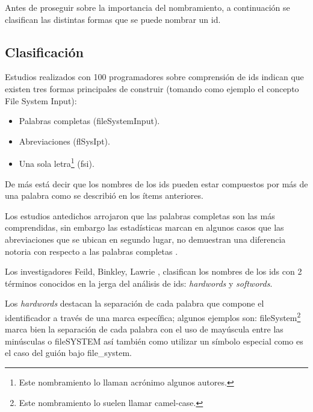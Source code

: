 \documentclass[a4paper,12pt]{report}
\begin{document}

Antes de proseguir sobre la importancia del nombramiento, a continuación se clasifican las distintas formas que se puede nombrar un id.

\subsection{Clasificación}
\label{sec:clasif}%

Estudios realizados con 100 programadores \cite{DCHD06} sobre comprensión de ids indican que existen tres formas principales de construir (tomando como ejemplo el concepto \textsf{File System Input}): 

\begin{itemize}
\itemsep0em%
\item Palabras completas (\textsf{fileSystemInput}).
\item Abreviaciones (\textsf{flSysIpt}).
\item Una sola letra\footnote[1]{Este nombramiento lo llaman acrónimo algunos autores.} (\textsf{fsi}). 
\end{itemize}

De más está decir que los nombres de los ids pueden estar compuestos por más de una palabra como se describió en los ítems anteriores.

Los estudios antedichos arrojaron que las palabras completas son las más comprendidas, sin embargo las estadísticas marcan en algunos casos que las abreviaciones que se ubican en segundo lugar, no demuestran una diferencia notoria con respecto a las palabras completas \cite{DCHD06}.

Los investigadores Feild, Binkley, Lawrie \cite{FBL06,HDD06,DMDJ13}, clasifican los nombres de los ids con 2 términos conocidos en la jerga del análisis de ids: \textit{hardwords} y \textit{softwords}.

Los \textit{hardwords} destacan la separación de cada palabra que compone el identificador a través de una marca específica; algunos ejemplos son: \mbox{\textsf{fileSystem}}\footnote[2]{Este nombramiento lo suelen llamar camel-case.} marca bien la separación de cada palabra con el uso de mayúscula entre las minúsculas o \mbox{\textsf{fileSYSTEM}} así también como utilizar un símbolo especial como es el caso del guión bajo \textsf{file\_system}. 
\end{document}

